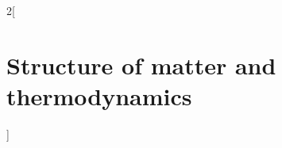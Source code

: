 \documentclass[../../../main.tex]{subfiles}
\begin{document}
\begin{multicols}{2}[\section{Structure of matter and thermodynamics}]
    
\end{multicols}
\end{document}
